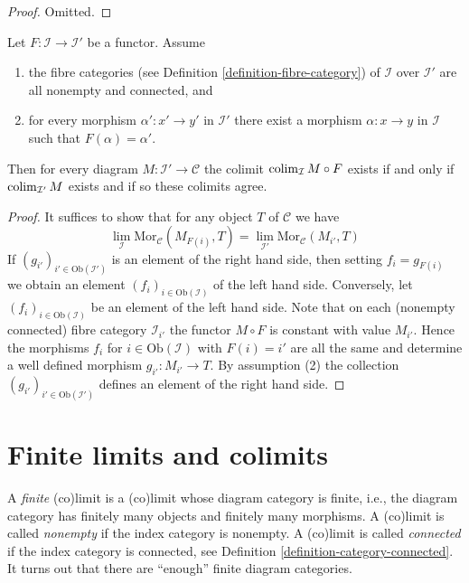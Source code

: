 \begin{proof}
Omitted.
\end{proof}

\begin{lemma}
\label{lemma-colimit-constant-connected-fibers}
Let $F : \mathcal{I} \to \mathcal{I}'$ be a functor.
Assume
\begin{enumerate}
\item the fibre categories (see
Definition \ref{definition-fibre-category})
of $\mathcal{I}$ over $\mathcal{I}'$ are all nonempty and connected, and
\item for every morphism $\alpha' : x' \to y'$ in $\mathcal{I}'$ there
exist a morphism $\alpha : x \to y$ in $\mathcal{I}$ such that
$F(\alpha) = \alpha'$.
\end{enumerate}
Then for every diagram $M : \mathcal{I}' \to \mathcal{C}$
the colimit $\mathop{\rm colim}\nolimits_\mathcal{I} M \circ F$ exists if and only
if $\mathop{\rm colim}\nolimits_{\mathcal{I}'} M$ exists and if so these colimits
agree.
\end{lemma}

\begin{proof}
It suffices to show that for any object $T$ of $\mathcal{C}$ we have
$$
\lim_\mathcal{I} \text{Mor}_{\mathcal{C}}(M_{F(i)}, T)
=
\lim_{\mathcal{I}'} \text{Mor}_{\mathcal{C}}(M_{i'}, T)
$$
If $(g_{i'})_{i' \in \text{Ob}(\mathcal{I}')}$ is an element of
the right hand side, then setting $f_i = g_{F(i)}$ we obtain an
element $(f_i)_{i \in \text{Ob}(\mathcal{I})}$ of the left hand side.
Conversely, let $(f_i)_{i \in \text{Ob}(\mathcal{I})}$ be an element of the
left hand side. Note that on each (nonempty connected)
fibre category $\mathcal{I}_{i'}$ the functor $M \circ F$
is constant with value $M_{i'}$. Hence the morphisms
$f_i$ for $i \in \text{Ob}(\mathcal{I})$ with $F(i) = i'$
are all the same and determine a well defined morphism
$g_{i'} : M_{i'} \to T$. By assumption (2) the collection
$(g_{i'})_{i' \in \text{Ob}(\mathcal{I}')}$ defines an element
of the right hand side.
\end{proof}







\section{Finite limits and colimits}
\label{section-finite-limits}

\noindent
A {\it finite} (co)limit is a (co)limit whose diagram category is finite,
i.e., the diagram category has finitely many objects and finitely many
morphisms. A (co)limit is called {\it nonempty} if the index category is
nonempty. A (co)limit is called {\it connected} if the index category is
connected, see
Definition \ref{definition-category-connected}.
It turns out that there are ``enough'' finite diagram categories.

